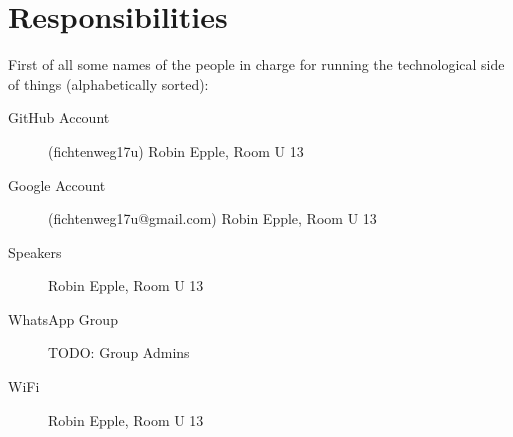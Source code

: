 \chapter{Responsibilities} \label{chap:responsibilities}

First of all some names of the people in charge for running the technological side of things (alphabetically sorted):

\begin{description}
    \item[GitHub Account] (fichtenweg17u) Robin Epple, Room U 13
    \item[Google Account] (fichtenweg17u@gmail.com) Robin Epple, Room U 13
    \item[Speakers] Robin Epple, Room U 13
    \item[WhatsApp Group] {\color{red} TODO: Group Admins}
    \item[WiFi] Robin Epple, Room U 13
\end{description}